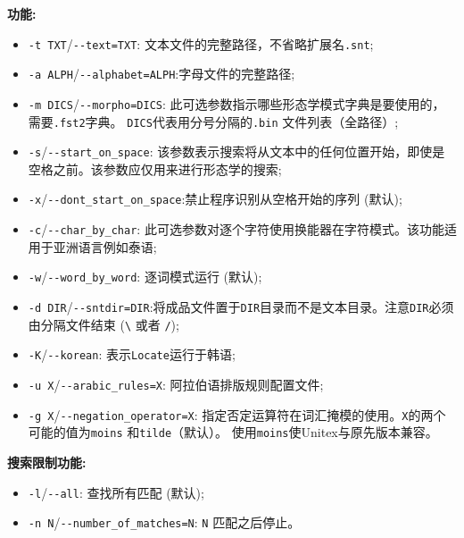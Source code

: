 \bigskip
\noindent \textbf{功能:}
\begin{itemize}
\item \verb+-t TXT+/\verb+--text=TXT+: 文本文件的完整路径，不省略扩展名\verb+.snt+;

  \item \verb+-a ALPH+/\verb+--alphabet=ALPH+:字母文件的完整路径;
  
  \item \verb+-m DICS+/\verb+--morpho=DICS+: 此可选参数指示哪些形态学模式字典是要使用的，需要\verb+.fst2+字典。  \verb+DICS+代表用分号分隔的\verb+.bin+ 文件列表（全路径）;
  
  \item \verb+-s+/\verb+--start_on_space+: 该参数表示搜索将从文本中的任何位置开始，即使是空格之前。该参数应仅用来进行形态学的搜索;

  
  \item \verb+-x+/\verb+--dont_start_on_space+:禁止程序识别从空格开始的序列 (默认);
	
  \item \verb+-c+/\verb+--char_by_char+: 此可选参数对逐个字符使用换能器在字符模式。该功能适用于亚洲语言例如泰语;
  
  \item \verb+-w+/\verb+--word_by_word+: 逐词模式运行 (默认);
  
\item \verb+-d DIR+/\verb+--sntdir=DIR+:将成品文件置于\verb+DIR+目录而不是文本目录。注意\verb+DIR+必须由分隔文件结束 (\verb+\+ 或者 \verb+/+);
  
  \item \verb+-K+/\verb+--korean+: 表示\verb+Locate+运行于韩语;

  \item \verb+-u X+/\verb+--arabic_rules=X+: 阿拉伯语排版规则配置文件;

  \item \verb+-g X+/\verb+--negation_operator=X+:
  指定否定运算符在词汇掩模的使用。\verb+X+的两个可能的值为\verb+moins+ 和\verb+tilde+（默认）。
  使用\verb+moins+使Unitex与原先版本兼容。
\end{itemize}

\bigskip
\noindent \textbf{搜索限制功能:}
\begin{itemize}
\item \verb+-l+/\verb+--all+: 查找所有匹配 (默认);
\item \verb+-n N+/\verb+--number_of_matches=N+: 
  \verb+N+ 匹配之后停止。
\end{itemize}

